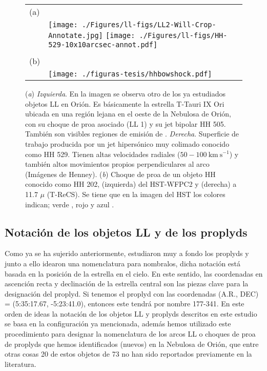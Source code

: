 \begin{figure}[htp]
\centering
\begin{tabular}{l l}
(a) & \\
 & \texttt{[image: ./Figures/ll-figs/LL2-Will-Crop-Annotate.jpg]}
\texttt{[image: ./Figures/ll-figs/HH-529-10x10arcsec-annot.pdf]}
\\
& \\[2\baselineskip]
(b) & \\
& \texttt{[image: ./figuras-tesis/hhbowshock.pdf]}
\\
\end{tabular}
\caption{(\textit{a}) \textit{Izquierda}. En la imagen se observa otro de los ya estudiados objetos LL en Orión. Es básicamente la estrella T-Tauri IX Ori ubicada en una región lejana en el oeste de la Nebulosa de Orión, con su choque de proa asociado (LL 1) y su jet bipolar HH 505. También son visibles regiones de emisión de \oiii{}. \textit{Derecha}. Superficie de trabajo producida por un jet hipersónico muy colimado conocido como HH 529. Tienen altas velocidades radiales (\(50-100 ~\text{km}~\text{s}^{-1}\)) y también altos  movimientos propios perpendiculares al arco (Imágenes de Henney). (\textit{b}) Choque de proa de un objeto HH conocido como HH 202, (izquierda) del HST-WFPC2 y (derecha) a 11.7 \(\mu\) (T-ReCS). Se tiene que en la imagen del HST los colores indican; verde \ha{}, rojo \nii{} y azul \oiii{} \citep{Smith:2005}.}\label{fig:objecthh}
\end{figure}

\subsection{Notación de los objetos LL y de los proplyds}
\label{sec:notacion}

Como ya se ha sujerido anteriormente, \citet{Odell:1994} estudiaron muy a fondo los proplyds y junto a  ello idearon una nomenclatura para nombralos, dicha notación está basada en la posición de la estrella en el cielo. En este sentido, las coordenadas en ascención recta y declinación de la estrella central son las piezas clave para la designación del proplyd. Si tenemos el proplyd con las coordenadas (A.R., DEC) = (5:35:17.67, -5:23:41.0), entonces este tendrá por nombre 177-341. En este orden de ideas la notación de los objetos LL y proplyds descritos en este estudio se basa en la configuración ya mencionada, además hemos utilizado este procedimiento para designar la nomenclatura de los arcos LL o choques de proa de proplyds que hemos identificados (nuevos) en la Nebulosa de Orión, que entre otras cosas 20 de estos objetos de 73 no han sido reportados previamente en la literatura.

